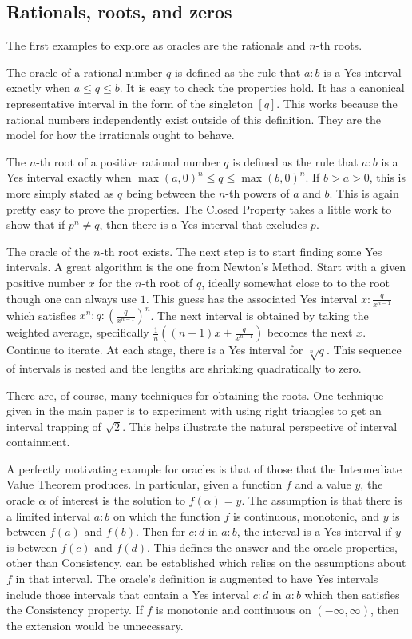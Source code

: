 \documentclass[12pt]{article}
\theoremstyle{remark}
\begin{document}
\subsection{Rationals, roots, and zeros}

The first examples to explore as oracles are the rationals and $n$-th roots. 

The oracle of a rational number $q$ is defined as the rule that $a:b$ is a Yes interval exactly when $a \leq q \leq b$. It is easy to check the properties hold. It has a canonical representative interval in the form of the singleton $[q]$. This works because the rational numbers independently exist outside of this definition. They are the model for how the irrationals ought to behave.  

The $n$-th root of a positive rational number $q$ is defined as the rule that $a:b$ is a Yes interval exactly when $\max(a, 0)^n \leq q \leq \max(b,0)^n$. If $b > a> 0$, this is more simply stated as $q$ being between the $n$-th powers of $a$ and $b$. This is again pretty easy to prove the properties. The Closed Property takes a little work to show that if $p^n \neq q$, then there is a Yes interval that excludes $p$. 

The oracle of the $n$-th root exists. The next step is to start finding some Yes intervals. A great algorithm is the one from Newton's Method. Start with a given positive number $x$ for the $n$-th root of $q$, ideally somewhat close to to the root though one can always use $1$. This guess has the associated Yes interval $x:\frac{q}{x^{n-1}}$ which satisfies $x^n : q : (\frac{q}{x^{n-1}})^n$. The next interval is obtained by taking the weighted average, specifically $\frac{1}{n}( (n-1) x + \frac{q}{x^{n-1}} )$ becomes the next $x$. Continue to iterate. At each stage, there is a Yes interval for $\sqrt[n]{q}$. This sequence of intervals is nested and the lengths are shrinking quadratically to zero.  

There are, of course, many techniques for obtaining the roots. One technique given in the main paper is to experiment with using right triangles to get an interval trapping of $\sqrt{2}$. This helps illustrate the natural perspective of interval containment.  

A perfectly motivating example for oracles is that of those that the Intermediate Value Theorem produces. In particular, given a function $f$ and a value $y$, the oracle $\alpha$ of interest is the solution to $f(\alpha) = y$. The assumption is that there is a limited interval $a:b$ on which the function $f$ is continuous, monotonic, and $y$ is between $f(a)$ and $f(b)$. Then for $c:d$ in $a:b$, the interval is a Yes interval if $y$ is between $f(c)$ and $f(d)$. This defines the answer and the oracle properties, other than Consistency, can be established which relies on the assumptions about $f$ in that interval. The oracle's definition is augmented to have Yes intervals include those intervals that contain a Yes interval $c:d$ in $a:b$ which then satisfies the Consistency property. If $f$ is monotonic and continuous on $(-\infty, \infty)$, then the extension would be unnecessary.  
\end{document}
